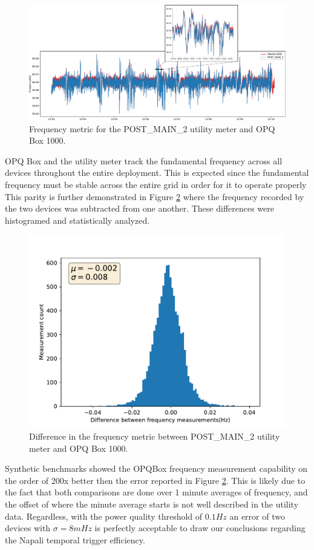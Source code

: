\begin{figure}[ht!]
    \centering
    \includegraphics[width=1\linewidth]{img/napali_eval/gt/gt_frequency.pdf}
    \caption{Frequency metric for the POST\_MAIN\_2 utility meter and OPQ Box 1000.}
    \label{expdes:fig:postmain2:freq}
\end{figure}

OPQ Box and the utility meter track the fundamental frequency across all devices throughout the entire deployment.
This is expected since the fundamental frequency must be stable across the entire grid in order for it to operate properly
This parity is further demonstrated in Figure \ref{expdes:fig:postmain2:freq_diff} where the frequency recorded by the two devices was subtracted from one another.
These differences were histogramed and statistically analyzed.

\begin{figure}[ht!]
    \centering
    \includegraphics[width=0.6\linewidth]{img/napali_eval/gt/gt_f_diff.pdf}
    \caption{Difference in the frequency metric between POST\_MAIN\_2 utility meter and OPQ Box 1000.}
    \label{expdes:fig:postmain2:freq_diff}
\end{figure}

Synthetic benchmarks showed the OPQBox frequency measurement capability on the order of 200x better then the error reported in Figure \ref{expdes:fig:postmain2:freq_diff}.
This is likely due to the fact that both comparisons are done over 1 minute averages of frequency, and the offset of where the minute average starts is not well described in the utility data.
Regardless, with the power quality threshold of $0.1Hz$ an error of two devices with $\sigma=8mHz$ is perfectly acceptable to draw our conclusions regarding the Napali temporal trigger efficiency.


